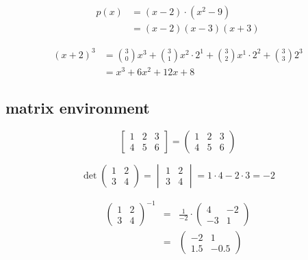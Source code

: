 \documentclass{article}
\begin{document}
\begin{align*}
	p(x)&=(x-2) \cdot (x^2-9) \\
	&=(x-2)(x-3)(x+3) 
\end{align*}

\begin{align*}
	(x+2)^3 &=\binom{3}{0}x^3+\binom{3}{1}x^2\cdot 2^1+\binom{3}{2}x^1\cdot 2^2+\binom{3}{3} 2^3\\[2mm] 
	&= x^3+6x^2+12x+8
\end{align*}


\subsection{matrix environment}

\begin{equation}
	\begin{bmatrix} %
		1 & 2 & 3\\
		4 & 5 & 6
	\end{bmatrix}
	=
	\begin{pmatrix} %
		1 & 2 & 3\\
		4 & 5 & 6
	\end{pmatrix}
\end{equation}


$$
\det 
\begin{pmatrix}
	1 & 2\\
	3 &4
\end{pmatrix}
=
\begin{vmatrix} %
	1 & 2\\
	3 &4
\end{vmatrix}
=1\cdot 4-2\cdot 3=-2
$$


\begin{eqnarray}
	\begin{pmatrix}
		1 & 2\\
		3 &4
	\end{pmatrix}^{-1}
	&=&
	\frac{1}{-2}\cdot
	\begin{pmatrix}
		4 & -2\\
		-3 &1
	\end{pmatrix} \nonumber \\[2mm]
	&=&
	\begin{pmatrix}
		-2 & 1\\
		1.5 &-0.5
	\end{pmatrix}
\end{eqnarray}
\end{document}
